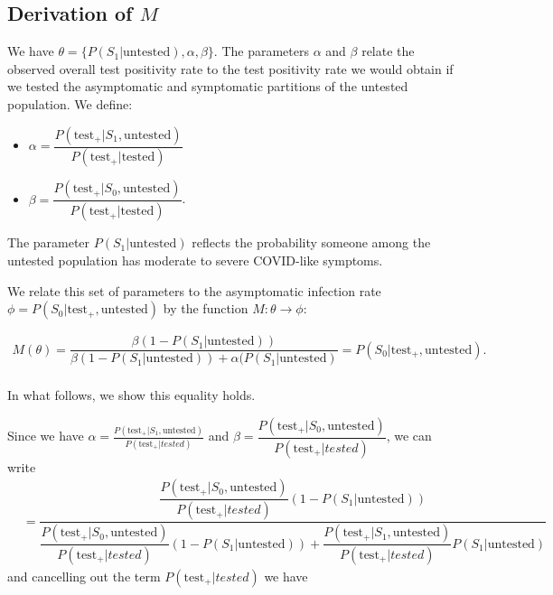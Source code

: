 \documentclass[12pt,twoside]{smiththesis}
\providecommand{\tightlist}{%
  \setlength{\itemsep}{0pt}\setlength{\parskip}{0pt}}
\begin{document}
\newpage

\hypertarget{derivation-of-m}{%
\subsection{\texorpdfstring{Derivation of \(M\)}{Derivation of M}}\label{derivation-of-m}}

\indent We have \(\theta = \{P(S_1|\text{untested}), \alpha, \beta \}\). The parameters \(\alpha\) and \(\beta\) relate the observed overall test positivity rate to the test positivity rate we would obtain if we tested the asymptomatic and symptomatic partitions of the untested population. We define:
\begin{itemize}
\tightlist
\item
  \(\alpha = \dfrac{P(\text{test}_+|S_1,\text{untested})}{P(\text{test}_+|\text{tested})}\)
\item
  \(\beta = \dfrac{P(\text{test}_+|S_0,\text{untested})}{P(\text{test}_+|\text{tested})}\).
\end{itemize}
The parameter \(P(S_1|\text{untested})\) reflects the probability someone among the untested population has moderate to severe COVID-like symptoms.

We relate this set of parameters to the asymptomatic infection rate \(\phi = P(S_0|\text{test}_+, \text{untested})\) by the function \(M: \theta \to \phi\):
\begin{tcolorbox}
\vspace{2 mm}
\begin{align*}   
 M(\theta)  = \dfrac{\beta (1- P(S_1|\text{untested}))}{\beta(1- P(S_1|\text{untested})) + \alpha(P(S_1|\text{untested})} = P(S_0|\text{test}_+, \text{untested}).\\
\end{align*}
\end{tcolorbox}
In what follows, we show this equality holds.

\noindent Since we have \(\alpha = \frac{P(\text{test}_+|S_1, \text{untested})}{P(\text{test}_+|tested)}\) and \(\beta = \dfrac{P(\text{test}_+|S_0, \text{untested})}{P(\text{test}_+|tested)}\), we can write
\begin{align*}  &= \dfrac{\dfrac{P(\text{test}_+|S_0, \text{untested})}{P(\text{test}_+|tested)}(1 - P(S_1|\text{untested}))}{\dfrac{P(\text{test}_+|S_0, \text{untested})}{P(\text{test}_+|tested)}(1-P(S_1|\text{untested})) + \dfrac{P(\text{test}_+|S_1, \text{untested})}{P(\text{test}_+|tested)} P(S_1|\text{untested})}
\end{align*}
and cancelling out the term \(P(\text{test}_+|tested)\) we have
\end{document}
